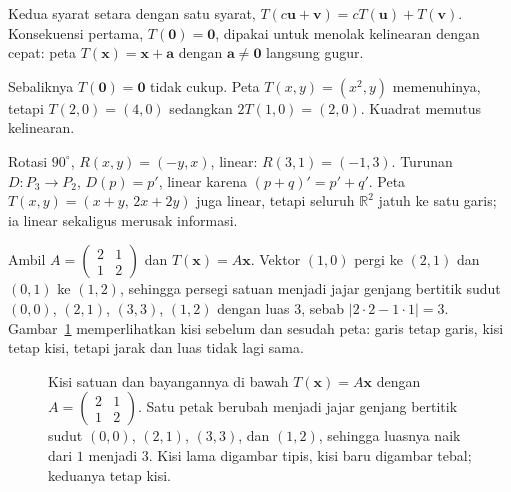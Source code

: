 Kedua syarat setara dengan satu syarat,
$T(c\mathbf{u}+\mathbf{v})=cT(\mathbf{u})+T(\mathbf{v})$. Konsekuensi pertama,
$T(\mathbf{0})=\mathbf{0}$, dipakai untuk menolak kelinearan dengan cepat: peta
$T(\mathbf{x})=\mathbf{x}+\mathbf{a}$ dengan $\mathbf{a}\neq\mathbf{0}$ langsung gugur.

Sebaliknya $T(\mathbf{0})=\mathbf{0}$ tidak cukup. Peta $T(x,y)=(x^{2},y)$ memenuhinya,
tetapi
$T(2,0)=(4,0)$ sedangkan $2T(1,0)=(2,0)$. Kuadrat memutus kelinearan.

Rotasi $90^{\circ}$, $R(x,y)=(-y,x)$, linear: $R(3,1)=(-1,3)$. Turunan $D\colon P_{3}\to P_{2}$, $D(p)=p'$, linear karena $(p+q)'=p'+q'$. Peta $T(x,y)=(x+y,\,2x+2y)$ juga linear, tetapi seluruh $\mathbb{R}^{2}$ jatuh ke satu garis; ia linear sekaligus merusak informasi.

Ambil
$A=\begin{pmatrix}2&1\\1&2\end{pmatrix}$ dan $T(\mathbf{x})=A\mathbf{x}$. Vektor $(1,0)$ pergi
ke $(2,1)$ dan $(0,1)$ ke $(1,2)$, sehingga persegi satuan menjadi jajar genjang bertitik
sudut
$(0,0)$, $(2,1)$, $(3,3)$, $(1,2)$ dengan luas $3$, sebab $|2\cdot2-1\cdot1|=3$.
Gambar~\ref{fig:kisi-07} memperlihatkan kisi sebelum dan sesudah peta: garis tetap garis, kisi
tetap kisi, tetapi jarak dan luas tidak lagi sama.

\begin{figure}[htbp]
\centering
{}
\caption{Kisi satuan dan bayangannya di bawah $T(\mathbf{x})=A\mathbf{x}$ dengan
$A=\begin{pmatrix}2&1\\1&2\end{pmatrix}$. Satu petak berubah menjadi jajar genjang bertitik
sudut $(0,0)$, $(2,1)$, $(3,3)$, dan $(1,2)$, sehingga luasnya naik dari $1$ menjadi $3$.
Kisi lama digambar tipis, kisi baru digambar tebal; keduanya tetap kisi.}
\label{fig:kisi-07}
\end{figure}

